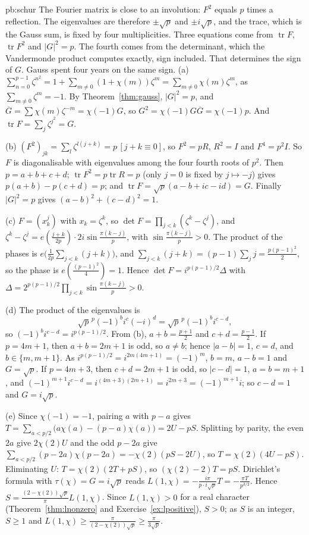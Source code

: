 \begin{solution}{pb:schur}
\idea The Fourier matrix is close to an involution: $F^2$ equals $p$ times a reflection. The eigenvalues are therefore $\pm\sqrt p$ and $\pm i\sqrt p$, and the trace, which is the Gauss sum, is fixed by four multiplicities. Three equations come from $\operatorname{tr} F$, $\operatorname{tr} F^2$ and $|G|^2=p$. The fourth comes from the determinant, which the Vandermonde product computes exactly, sign included. That determines the sign of $G$. Gauss spent four years on the same sign.
\writeup (a) $\sum_{n=0}^{p-1}\zeta^{n^2}=1+\sum_{m\ne0}(1+\chi(m))\zeta^m=\sum_{m\ne0}\chi(m)\zeta^m$, as $\sum_{m\ne0}\zeta^m=-1$. By Theorem~\ref{thm:gauss}, $|G|^2=p$, and
$\overline G=\sum\chi(m)\zeta^{-m}=\chi(-1)G$, so $G^2=\chi(-1)G\overline G=\chi(-1)p$. And $\operatorname{tr}F=\sum_j\zeta^{j^2}=G$.

(b) $(F^2)_{jk}=\sum_l\zeta^{l(j+k)}=p\,[j+k\equiv0]$, so $F^2=pR$, $R^2=I$ and $F^4=p^2I$. So $F$ is diagonalisable with eigenvalues among the four fourth roots of $p^2$. Then
$p=a+b+c+d$; $\operatorname{tr}F^2=p\operatorname{tr}R=p$ (only $j=0$ is fixed by $j\mapsto-j$) gives $p(a+b)-p(c+d)=p$; and $\operatorname{tr}F=\sqrt p(a-b+ic-id)=G$. Finally
$|G|^2=p$ gives $(a-b)^2+(c-d)^2=1$.

(c) $F=(x_k^j)$ with $x_k=\zeta^k$, so $\det F=\prod_{j<k}(\zeta^k-\zeta^j)$, and $\zeta^k-\zeta^j=e(\frac{j+k}{2p})\cdot2i\sin\frac{\pi(k-j)}p$, with $\sin\frac{\pi(k-j)}p>0$. The
product of the phases is $e\bigl(\frac1{2p}\sum_{j<k}(j+k)\bigr)$, and $\sum_{j<k}(j+k)=(p-1)\sum_jj=\frac{p(p-1)^2}2$, so the phase is $e(\frac{(p-1)^2}4)=1$. Hence
$\det F=i^{p(p-1)/2}\Delta$ with $\Delta=2^{p(p-1)/2}\prod_{j<k}\sin\frac{\pi(k-j)}p>0$.

(d) The product of the eigenvalues is
\[
\sqrt p^{\,p}(-1)^bi^c(-i)^d=\sqrt p^{\,p}(-1)^bi^{c-d},
\]
so $(-1)^bi^{c-d}=i^{p(p-1)/2}$. From (b), $a+b=\frac{p+1}2$ and $c+d=\frac{p-1}2$.
If $p=4m+1$, then $a+b=2m+1$ is odd, so $a\ne b$; hence $|a-b|=1$, $c=d$, and $b\in\{m,m+1\}$. As $i^{p(p-1)/2}=i^{2m(4m+1)}=(-1)^m$, $b=m$, $a-b=1$ and $G=\sqrt p$. If $p=4m+3$,
then $c+d=2m+1$ is odd, so $|c-d|=1$, $a=b=m+1$, and $(-1)^{m+1}i^{c-d}=i^{(4m+3)(2m+1)}=i^{2m+3}=(-1)^{m+1}i$; so $c-d=1$ and $G=i\sqrt p$.

(e) Since $\chi(-1)=-1$, pairing $a$ with $p-a$ gives $T=\sum_{a<p/2}\bigl(a\chi(a)-(p-a)\chi(a)\bigr)=2U-pS$. Splitting by parity, the even $2a$ give $2\chi(2)U$ and the odd
$p-2a$ give $\sum_{a<p/2}(p-2a)\chi(p-2a)=-\chi(2)(pS-2U)$, so $T=\chi(2)(4U-pS)$. Eliminating $U$: $T=\chi(2)(2T+pS)$, so $(\chi(2)-2)T=pS$. Dirichlet's formula with
$\tau(\chi)=G=i\sqrt p$ reads $L(1,\chi)=-\frac{i\pi}{p\cdot i\sqrt p}T=-\frac{\pi T}{p^{3/2}}$. Hence $S=\frac{(2-\chi(2))\sqrt p}\pi L(1,\chi)$. Since $L(1,\chi)>0$ for a real character
(Theorem~\ref{thm:lnonzero} and Exercise~\ref{ex:lpositive}), $S>0$; as $S$ is an integer, $S\ge1$ and $L(1,\chi)\ge\frac\pi{(2-\chi(2))\sqrt p}\ge\frac\pi{3\sqrt p}$.


\end{solution}
